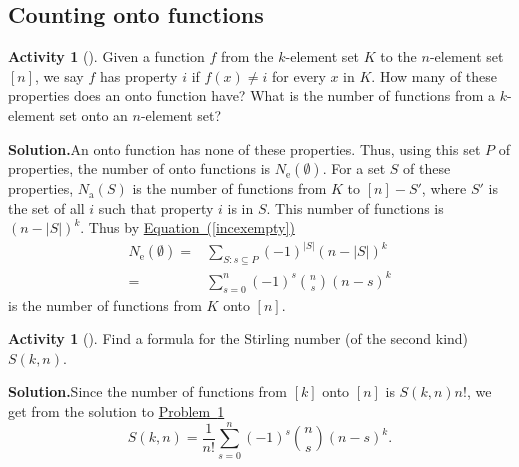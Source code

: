\documentclass[10pt,]{book}
\theoremstyle{plain}
\theoremstyle{definition}
\newtheorem{activity}[project]{Activity}
\numberwithin{equation}{chapter}
\newcommand{\amp}{&}
\begin{document}
\subsection[{Counting onto functions}]{Counting onto functions}\label{subsection-55}
\begin{activity}[]\label{numontofun}
Given a function \(f\) from the \(k\)-element set \(K\) to the \(n\)-element set \([n]\), we say \(f\) has property \(i\) if \(f(x)\not= i\) for every \(x\) in \(K\). How many of these properties does an onto function have? What is the number of functions from a \(k\)-element set onto an \(n\)-element set?%
\par\medskip\noindent%
\textbf{Solution.}\quad An onto function has none of these properties. Thus, using this set \(P\) of properties, the number of onto functions is \(N_{\mbox{e} }(\emptyset)\). For a set \(S\) of these properties, \(N_{\mbox{a} }(S)\) is the number of functions from \(K\) to \([n]-S'\), where \(S'\) is the set of all \(i\) such that property \(i\) is in \(S\). This number of functions is \((n-|S|)^k\). Thus by \hyperref[incexempty]{Equation~(\ref{incexempty})}%
\begin{align*}
N_{\mbox{e} }(\emptyset)  =\amp  \sum_{S:s\subseteq P} (-1)^{|S|}
(n-|S|)^k\\
=\amp \sum_{s=0}^n (-1)^s\binom{n}{s}(n-s)^k
\end{align*}
is the number of functions from \(K\) onto \([n]\).%
\end{activity}
\begin{activity}[]\label{activity-220}
Find a formula for the Stirling number (of the second kind) \(S(k,n)\).%
\par\medskip\noindent%
\textbf{Solution.}\quad Since the number of functions from \([k]\) onto \([n]\) is \(S(k,n)n!\), we get from the solution to \hyperref[numontofun]{Problem~\ref{numontofun}}%
\begin{equation*}
S(k,n) = \frac{1}{n!}\sum_{s=0}^n (-1)^s\binom{n}{s}(n-s)^k.
\end{equation*}
%
\end{activity}
\typeout{************************************************}
\typeout{************************************************}
\end{document}
